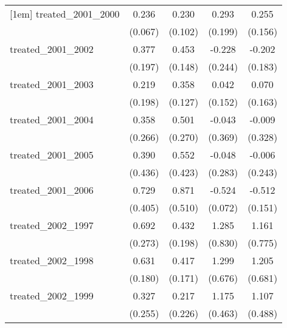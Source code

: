 {\begin{tabular}{l*{4}{c}}
[1em]
treated\_2001\_2000&       0.236\sym{***}&       0.230\sym{*}  &       0.293         &       0.255         \\
            &     (0.067)         &     (0.102)         &     (0.199)         &     (0.156)         \\
[1em]
treated\_2001\_2002&       0.377         &       0.453\sym{**} &      -0.228         &      -0.202         \\
            &     (0.197)         &     (0.148)         &     (0.244)         &     (0.183)         \\
[1em]
treated\_2001\_2003&       0.219         &       0.358\sym{**} &       0.042         &       0.070         \\
            &     (0.198)         &     (0.127)         &     (0.152)         &     (0.163)         \\
[1em]
treated\_2001\_2004&       0.358         &       0.501         &      -0.043         &      -0.009         \\
            &     (0.266)         &     (0.270)         &     (0.369)         &     (0.328)         \\
[1em]
treated\_2001\_2005&       0.390         &       0.552         &      -0.048         &      -0.006         \\
            &     (0.436)         &     (0.423)         &     (0.283)         &     (0.243)         \\
[1em]
treated\_2001\_2006&       0.729         &       0.871         &      -0.524\sym{***}&      -0.512\sym{***}\\
            &     (0.405)         &     (0.510)         &     (0.072)         &     (0.151)         \\
[1em]
treated\_2002\_1997&       0.692\sym{*}  &       0.432\sym{*}  &       1.285         &       1.161         \\
            &     (0.273)         &     (0.198)         &     (0.830)         &     (0.775)         \\
[1em]
treated\_2002\_1998&       0.631\sym{***}&       0.417\sym{*}  &       1.299         &       1.205         \\
            &     (0.180)         &     (0.171)         &     (0.676)         &     (0.681)         \\
[1em]
treated\_2002\_1999&       0.327         &       0.217         &       1.175\sym{*}  &       1.107\sym{*}  \\
            &     (0.255)         &     (0.226)         &     (0.463)         &     (0.488)         \\

\end{tabular}}
